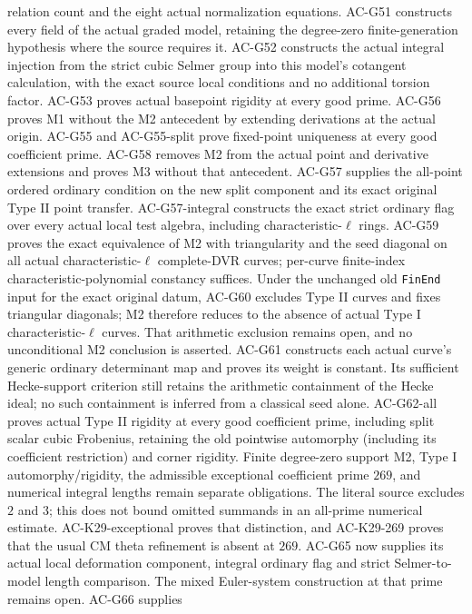 \documentclass[11pt,a4paper]{article}
\theoremstyle{definition}
\theoremstyle{remark}
\begin{document}
relation count and the eight actual normalization equations. AC-G51
constructs every field of the actual graded model, retaining the
degree-zero finite-generation hypothesis where the source requires it.
AC-G52 constructs the actual integral injection from the strict cubic
Selmer group into this model's cotangent calculation, with the exact
source local conditions and no additional torsion factor. AC-G53 proves actual basepoint rigidity at every good prime.
AC-G56 proves M1 without the M2 antecedent by extending derivations at
the actual origin. AC-G55 and AC-G55-split prove fixed-point uniqueness
at every good coefficient prime. AC-G58 removes M2 from the actual
point and derivative extensions and proves M3 without that antecedent.
AC-G57 supplies the all-point ordered ordinary condition on the new
split component and its exact original Type II point transfer.
AC-G57-integral constructs the exact strict ordinary flag over every
actual local test algebra, including characteristic-$\ell$ rings.
AC-G59 proves the exact equivalence of M2 with triangularity and the
seed diagonal on all actual characteristic-$\ell$ complete-DVR curves;
per-curve finite-index characteristic-polynomial constancy suffices.
Under the unchanged old \texttt{FinEnd} input for the exact original
datum, AC-G60 excludes Type II curves and fixes triangular diagonals;
M2 therefore reduces to the absence of actual Type I
characteristic-$\ell$ curves. That arithmetic exclusion remains open,
and no unconditional M2 conclusion is asserted.
AC-G61 constructs each actual curve's generic ordinary determinant map
and proves its weight is constant. Its sufficient Hecke-support criterion
still retains the arithmetic containment of the Hecke ideal; no such
containment is inferred from a classical seed alone.
AC-G62-all proves actual Type II rigidity at every good coefficient
prime, including split scalar cubic Frobenius, retaining the old
pointwise automorphy (including its coefficient restriction) and corner
rigidity. Finite degree-zero support M2, Type I automorphy/rigidity,
the admissible exceptional coefficient prime $269$, and numerical
integral lengths remain separate obligations. The literal source excludes
$2$ and $3$; this does not bound omitted summands in an all-prime
numerical estimate. AC-K29-exceptional proves that distinction, and
AC-K29-269 proves that the usual CM theta refinement is absent at $269$.
AC-G65 now supplies its actual local deformation component, integral
ordinary flag and strict Selmer-to-model length comparison. The mixed
Euler-system construction at that prime remains open. AC-G66 supplies
\end{document}
